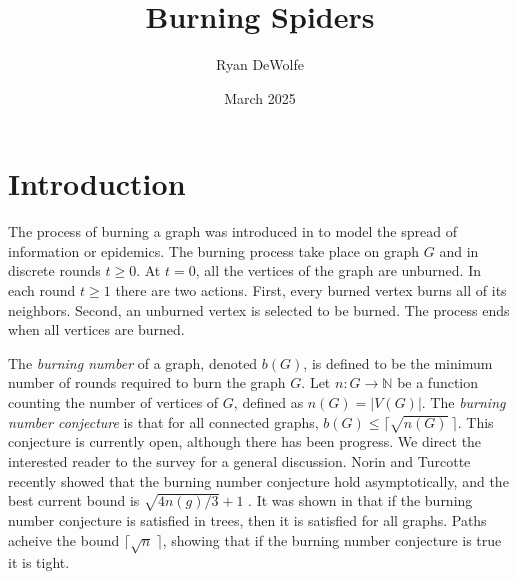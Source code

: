 \documentclass[12pt]{article}
\begin{document}
\title{Burning Spiders}
\author{Ryan DeWolfe}
\date{March 2025}
\maketitle


\section{Introduction}
The process of burning a graph was introduced in \cite{burning_intro} to model the spread of information or epidemics.
The burning process take place on graph $G$ and in discrete rounds $t \geq 0$. 
At $t=0$, all the vertices of the graph are unburned.
In each round $t \geq 1$ there are two actions.
First, every burned vertex burns all of its neighbors.
Second, an unburned vertex is selected to be burned.
The process ends when all vertices are burned.

The \textit{burning number} of a graph, denoted $b(G)$, is defined to be the minimum number of rounds required to burn the graph $G$.
Let $n: G \to \mathbb{N}$ be a function counting the number of vertices of $G$, defined as $n(G) = |V(G)|$.
The \textit{burning number conjecture} \cite{burning_intro} is that for all connected graphs, $b(G) \leq \lceil \sqrt{n(G)}\ \rceil$.
This conjecture is currently open, although there has been progress.
We direct the interested reader to the survey \cite{burning_survey} for a general discussion.
Norin and Turcotte \cite{asymptotic_bnc} recently showed that the burning number conjecture hold asymptotically, and the best current bound is $\sqrt{4n(g) \slash 3} + 1$ \cite{best_bnc}. 
It was shown in \cite{burning_intro} that if the burning number conjecture is satisfied in trees, then it is satisfied for all graphs.
Paths acheive the bound $\lceil \sqrt{n}\ \rceil$, showing that if the burning number conjecture is true it is tight.
\end{document}
